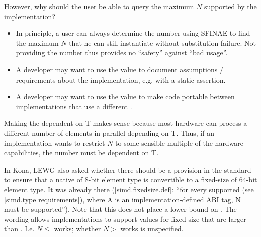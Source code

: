 However, why should the user be able to query the maximum $N$ supported by the implementation?
\begin{itemize}
  \item In principle, a user can always determine the number using SFINAE to find the maximum $N$ that he can still instantiate without substitution failure.
    Not providing the number thus provides no “safety” against “bad usage”.
  \item A developer may want to use the value to document assumptions / requirements about the implementation, e.g. with a static assertion.
  \item A developer may want to use the value to make code portable between implementations that use a different .
\end{itemize}

Making the  dependent on \type T makes sense because most hardware can process a different number of elements in parallel depending on \type T.
Thus, if an implementation wants to restrict $N$ to some sensible multiple of the hardware capabilities, the number must be dependent on \type T.

In Kona, LEWG also asked whether there should be a provision in the standard to ensure that a native \simd of 8-bit element type is convertible to a fixed-size \simd of 64-bit element type.
It was already there (\ref{simd.fixedsize.def}: “for every supported \simd[<T, A>] (see \ref{simd.type requirements}), where \type A is an implementation-defined ABI tag, \code N $=$ \simd[<T, A>::size()] must be supported”).
Note that this does not place a lower bound on .
The wording allows implementations to support values for fixed-size \simd that are larger than .
I.e. $N \leq $  works; whether $N > $  works is unspecified.

